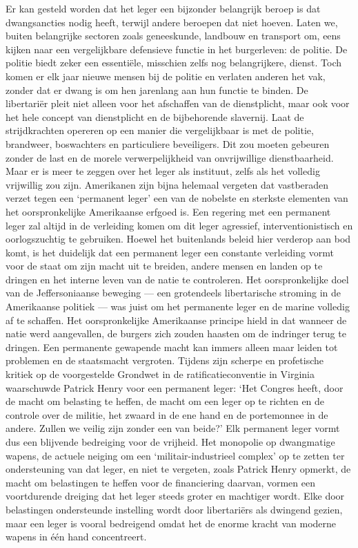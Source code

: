 \documentclass[
  a5paper,
  smalldemyvopaper,10pt,twoside,onecolumn,openright,extrafontsizes,hidelinks]{memoir}
\begin{document}
Er kan gesteld worden dat het leger een bijzonder belangrijk beroep is
dat dwangsancties nodig heeft, terwijl andere beroepen dat niet hoeven.
Laten we, buiten belangrijke sectoren zoals geneeskunde, landbouw en
transport om, eens kijken naar een vergelijkbare defensieve functie in
het burgerleven: de politie. De politie biedt zeker een essentiële,
misschien zelfs nog belangrijkere, dienst. Toch komen er elk jaar nieuwe
mensen bij de politie en verlaten anderen het vak, zonder dat er dwang
is om hen jarenlang aan hun functie te binden. De libertariër pleit niet
alleen voor het afschaffen van de dienstplicht, maar ook voor het hele
concept van dienstplicht en de bijbehorende slavernij. Laat de
strijdkrachten opereren op een manier die vergelijkbaar is met de
politie, brandweer, boswachters en particuliere beveiligers. Dit zou
moeten gebeuren zonder de last en de morele verwerpelijkheid van
onvrijwillige dienstbaarheid. Maar er is meer te zeggen over het leger
als instituut, zelfs als het volledig vrijwillig zou zijn. Amerikanen
zijn bijna helemaal vergeten dat vastberaden verzet tegen een `permanent
leger' een van de nobelste en sterkste elementen van het oorspronkelijke
Amerikaanse erfgoed is. Een regering met een permanent leger zal altijd
in de verleiding komen om dit leger agressief, interventionistisch en
oorlogszuchtig te gebruiken. Hoewel het buitenlands beleid hier verderop
aan bod komt, is het duidelijk dat een permanent leger een constante
verleiding vormt voor de staat om zijn macht uit te breiden, andere
mensen en landen op te dringen en het interne leven van de natie te
controleren. Het oorspronkelijke doel van de Jeffersoniaanse beweging
--- een grotendeels libertarische stroming in de Amerikaanse politiek
--- was juist om het permanente leger en de marine volledig af te
schaffen. Het oorspronkelijke Amerikaanse principe hield in dat wanneer
de natie werd aangevallen, de burgers zich zouden haasten om de
indringer terug te dringen. Een permanente gewapende macht kan immers
alleen maar leiden tot problemen en de staatsmacht vergroten. Tijdens
zijn scherpe en profetische kritiek op de voorgestelde Grondwet in de
ratificatieconventie in Virginia waarschuwde Patrick Henry voor een
permanent leger: `Het Congres heeft, door de macht om belasting te
heffen, de macht om een leger op te richten en de controle over de
militie, het zwaard in de ene hand en de portemonnee in de andere.
Zullen we veilig zijn zonder een van beide?' Elk permanent leger vormt
dus een blijvende bedreiging voor de vrijheid. Het monopolie op
dwangmatige wapens, de actuele neiging om een `militair-industrieel
complex' op te zetten ter ondersteuning van dat leger, en niet te
vergeten, zoals Patrick Henry opmerkt, de macht om belastingen te heffen
voor de financiering daarvan, vormen een voortdurende dreiging dat het
leger steeds groter en machtiger wordt. Elke door belastingen
ondersteunde instelling wordt door libertariërs als dwingend gezien,
maar een leger is vooral bedreigend omdat het de enorme kracht van
moderne wapens in één hand concentreert.
\end{document}
